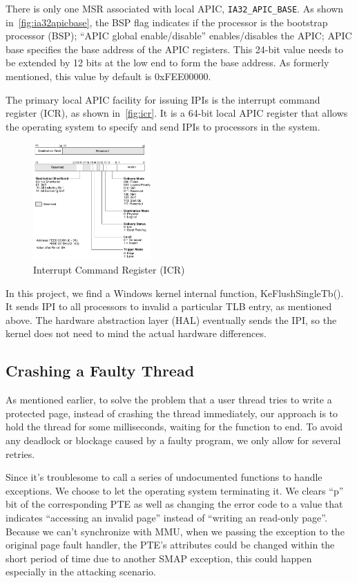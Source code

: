 There is only one MSR associated with local APIC, \texttt{IA32\_APIC\_BASE}. As shown in~\autoref{fig:ia32apicbase}, the BSP flag indicates if the processor is the bootstrap processor (BSP); ``APIC global enable/disable'' enables/disables the APIC; APIC base specifies the base address of the APIC registers. This 24-bit value needs to be extended by 12 bits at the low end to form the base address. As formerly mentioned, this value by default is 0xFEE00000.

The primary local APIC facility for issuing IPIs is the interrupt command register (ICR), as shown in~\autoref{fig:icr}. It is a 64-bit local APIC register that allows the operating system to specify and send IPIs to processors in the system.


\begin{figure}[th]
  \includegraphics[width=0.40\textwidth]{figures/icr}
  \centering
  \caption{Interrupt Command Register (ICR)}
  \label{fig:icr}
\end{figure}

In this project, we find a Windows kernel internal function, KeFlushSingleTb(). It sends IPI to all processors to invalid a particular TLB entry, as mentioned above. The hardware abstraction layer (HAL) eventually sends the IPI, so the kernel does not need to mind the actual hardware differences.


\subsection{Crashing a Faulty Thread}

As mentioned earlier, to solve the problem that a user thread tries to write a protected page, instead of crashing the thread immediately, our approach is to hold the thread for some milliseconds, waiting for the function to end. To avoid any deadlock or blockage caused by a faulty program, we only allow for several retries. 

Since it's troublesome to call a series of undocumented functions to handle exceptions. We choose to let the operating system terminating it. We clears ``p'' bit of the corresponding PTE as well as changing the error code to a value that indicates ``accessing an invalid page'' instead of ``writing an read-only page''. Because we can't synchronize with MMU, when we passing the exception to the original page fault handler, the PTE's attributes could be changed within the short period of time due to another SMAP exception, this could happen especially in the attacking scenario. 

